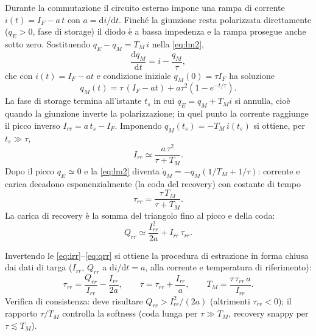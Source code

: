 \documentclass[11pt,a4paper]{article}
\newcommand{\ud}{\mathrm{d}}
\begin{document}
Durante la commutazione il circuito esterno impone una rampa di corrente
$i(t) = I_F - a\,t$ con $a = \ud i/\ud t$. Finch\'e la giunzione resta
polarizzata direttamente ($q_E > 0$, fase di storage) il diodo \`e a
bassa impedenza e la rampa prosegue anche sotto zero. Sostituendo
$q_E - q_M = T_M\, i$ nella \eqref{eq:lm2},
\begin{equation}
\frac{\ud q_M}{\ud t} = i - \frac{q_M}{\tau},
\end{equation}
che con $i(t) = I_F - a t$ e condizione iniziale $q_M(0) = \tau I_F$ ha
soluzione
\begin{equation}
q_M(t) = \tau\,(I_F - a t) + a \tau^2 \left(1 - e^{-t/\tau}\right).
\end{equation}
La fase di storage termina all'istante $t_s$ in cui $q_E = q_M + T_M i$
si annulla, cio\`e quando la giunzione inverte la polarizzazione; in quel
punto la corrente raggiunge il picco inverso $I_{rr} = a\,t_s - I_F$.
Imponendo $q_M(t_s) = -T_M\, i(t_s)$ si ottiene, per $t_s \gg \tau$,
\begin{equation}
\boxed{\;I_{rr} \simeq \frac{a\,\tau^2}{\tau + T_M}.\;}
\label{eq:irr}
\end{equation}
Dopo il picco $q_E \simeq 0$ e la \eqref{eq:lm2} diventa
$\dot q_M = -q_M \left( 1/T_M + 1/\tau \right)$: corrente e carica
decadono esponenzialmente (la coda del recovery) con costante di tempo
\begin{equation}
\boxed{\;\tau_{rr} = \frac{\tau\, T_M}{\tau + T_M}.\;}
\label{eq:taurr}
\end{equation}
La carica di recovery \`e la somma del triangolo fino al picco e della
coda:
\begin{equation}
Q_{rr} \simeq \frac{I_{rr}^2}{2a} + I_{rr}\,\tau_{rr}.
\label{eq:qrr}
\end{equation}

Invertendo le \eqref{eq:irr}--\eqref{eq:qrr} si ottiene la procedura di
estrazione in forma chiusa dai dati di targa ($I_{rr}$, $Q_{rr}$ a
$\ud i/\ud t = a$, alla corrente e temperatura di riferimento):
\begin{equation}
\boxed{\;
\tau_{rr} = \frac{Q_{rr}}{I_{rr}} - \frac{I_{rr}}{2a},
\qquad
\tau = \tau_{rr} + \frac{I_{rr}}{a},
\qquad
T_M = \frac{\tau\,\tau_{rr}\,a}{I_{rr}}.
\;}
\label{eq:extract}
\end{equation}
Verifica di consistenza: deve risultare $Q_{rr} > I_{rr}^2/(2a)$
(altrimenti $\tau_{rr}<0$); il rapporto $\tau/T_M$ controlla la softness
(coda lunga per $\tau \gg T_M$, recovery snappy per $\tau \lesssim T_M$).
\end{document}
